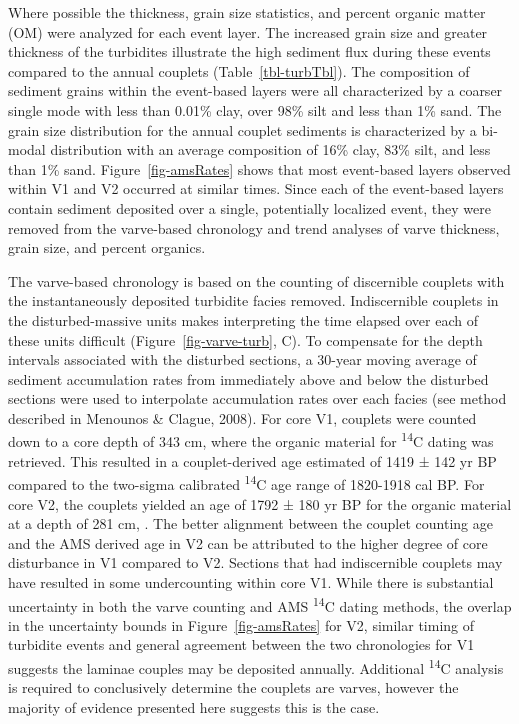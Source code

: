 \documentclass[
  letterpaper,
  DIV=11,
  numbers=noendperiod]{scrartcl}
\begin{document}
Where possible the thickness, grain size statistics, and percent organic
matter (OM) were analyzed for each event layer. The increased grain size
and greater thickness of the turbidites illustrate the high sediment
flux during these events compared to the annual couplets
(Table~\ref{tbl-turbTbl}). The composition of sediment grains within the
event-based layers were all characterized by a coarser single mode with
less than 0.01\% clay, over 98\% silt and less than 1\% sand. The grain
size distribution for the annual couplet sediments is characterized by a
bi-modal distribution with an average composition of 16\% clay, 83\%
silt, and less than 1\% sand. Figure~\ref{fig-amsRates} shows that most
event-based layers observed within V1 and V2 occurred at similar times.
Since each of the event-based layers contain sediment deposited over a
single, potentially localized event, they were removed from the
varve-based chronology and trend analyses of varve thickness, grain
size, and percent organics.

The varve-based chronology is based on the counting of discernible
couplets with the instantaneously deposited turbidite facies removed.
Indiscernible couplets in the disturbed-massive units makes interpreting
the time elapsed over each of these units difficult
(Figure~\ref{fig-varve-turb}, C). To compensate for the depth intervals
associated with the disturbed sections, a 30-year moving average of
sediment accumulation rates from immediately above and below the
disturbed sections were used to interpolate accumulation rates over each
facies (see method described in Menounos \& Clague, 2008). For core V1,
couplets were counted down to a core depth of 343 cm, where the organic
material for \textsuperscript{14}C dating was retrieved. This resulted
in a couplet-derived age estimated of 1419 ± 142 yr BP compared to the
two-sigma calibrated \textsuperscript{14}C age range of 1820-1918 cal
BP. For core V2, the couplets yielded an age of 1792 ± 180 yr BP for the
organic material at a depth of 281 cm, . The better alignment between
the couplet counting age and the AMS derived age in V2 can be attributed
to the higher degree of core disturbance in V1 compared to V2. Sections
that had indiscernible couplets may have resulted in some undercounting
within core V1. While there is substantial uncertainty in both the varve
counting and AMS \textsuperscript{14}C dating methods, the overlap in
the uncertainty bounds in Figure~\ref{fig-amsRates} for V2, similar
timing of turbidite events and general agreement between the two
chronologies for V1 suggests the laminae couples may be deposited
annually. Additional \textsuperscript{14}C analysis is required to
conclusively determine the couplets are varves, however the majority of
evidence presented here suggests this is the case.
\end{document}
